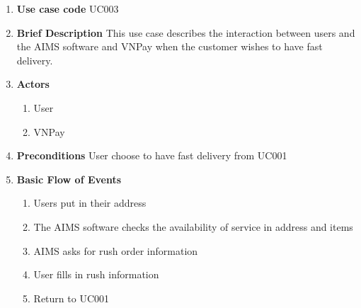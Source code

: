 \documentclass[../UseCaseSpecification.tex]{subfiles}
\begin{document}
\begin{enumerate}
    \item \textbf{Use case code}
    \newline
    UC003

    \item \textbf{Brief Description}
    \newline
    This use case describes the interaction between users and the AIMS software and VNPay when the customer wishes to have fast delivery.

    \item \textbf{Actors}
    \begin{enumerate}
        \item User
        \item VNPay
    \end{enumerate}

    \item \textbf{Preconditions}
    \newline
    User choose to have fast delivery from UC001

    \item \textbf{Basic Flow of Events}
    \begin{enumerate}
        \item Users put in their address
        \item The AIMS software checks the availability of service in address and items
        \item AIMS asks for rush order information
        \item User fills in rush information
        \item Return to UC001
    \end{enumerate}


\end{enumerate}
\end{document}
